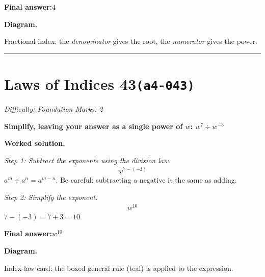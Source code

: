 \documentclass[11pt]{article}
\newcommand{\question}[1]{\par\medskip\noindent\textbf{#1}\par}
\begin{document}
\begin{answerbox}
\textbf{Final answer:}\quad \(\displaystyle 4\)
\end{answerbox}
\textbf{Diagram.}

\begin{center}
\end{center}
\small Fractional index: the \emph{denominator} gives the root, the \emph{numerator} gives the power.\normalsize

\medskip\hrule

\section*{Laws of Indices 43\quad\small\texttt{(a4-043)}}
\textit{Difficulty: Foundation \quad\textbar\quad Marks: 2}

\question{Simplify, leaving your answer as a single power of \( w \): \( w^7 \div w^{-3} \)}

\textbf{Worked solution.}

\textit{Step 1: Subtract the exponents using the division law.}
\[\begin{gathered}
w^{7-(-3)}
\end{gathered}\]
\( a^m \div a^n = a^{m-n} \). Be careful: subtracting a negative is the same as adding.

\textit{Step 2: Simplify the exponent.}
\[\begin{gathered}
w^{10}
\end{gathered}\]
\( 7 - (-3) = 7 + 3 = 10 \).

\begin{answerbox}
\textbf{Final answer:}\quad \(\displaystyle w^{10}\)
\end{answerbox}
\textbf{Diagram.}

\begin{center}
\end{center}
\small Index-law card: the boxed general rule (teal) is applied to the expression.\normalsize
\end{document}
